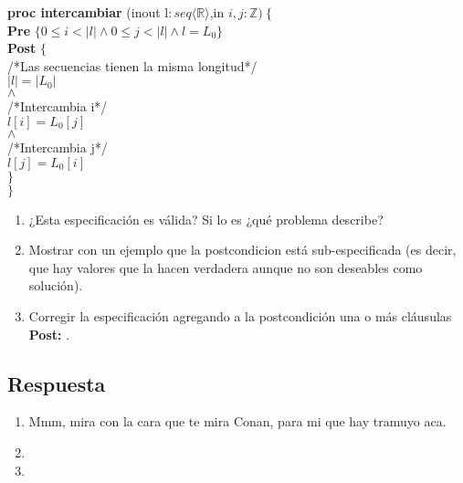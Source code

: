 \documentclass[a4paper]{article}
\begin{document}
			\textbf{proc intercambiar }(inout l$: seq\langle
				 \mathbb{R}\rangle$,in $i,j:\mathbb{Z})
			\ \{$\smallskip \\
			\hspace*{6mm} \textbf{Pre }$\{0\leq i<|l|
					\wedge 0\leq j<|l|\wedge l=L_0\}$\\
			\hspace*{6mm} \textbf{Post }$\{$\\
			\hspace*{6mm} /*Las secuencias tienen la misma longitud*/\\
			\hspace*{6mm} $|l|=|L_0|$\\
			\hspace*{6mm} $\wedge$\\
			\hspace*{6mm} /*Intercambia i*/\\
			\hspace*{6mm} $l[i]=L_0[j]$\\
			\hspace*{6mm} $\wedge$\\
			\hspace*{6mm} /*Intercambia j*/\\
			\hspace*{6mm} $l[j]=L_0[i]$\\
			\hspace*{6mm} $\}$\\
			$\}$
			
	\begin{enumerate}[label=\alph*)]
		\item ¿Esta especificación es válida? Si lo es ¿qué problema describe?
		\item Mostrar con un ejemplo que la postcondicion está sub-especificada (es decir, que 
				hay valores que la hacen verdadera aunque no son deseables como solución).
		\item Corregir la especificación agregando a la postcondición una o más cláusulas
			 \textbf{Post: }.
	\end{enumerate}
\subsection*{Respuesta}
	\begin{enumerate}[label=\alph*)]
		\item Mmm, mira con la cara que te mira Conan, para mi que hay tramuyo aca.
		\item
		\item
	\end{enumerate}
	
\end{document}
